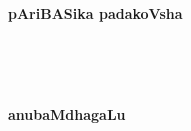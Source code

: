 \documentclass[twoside,11pt,openany]{book}
\begin{document}

\vfill\eject
\phantom{a}~
\thispagestyle{empty}
\newpage

\mainmatter

\setlength{\columnseprule}{.5pt}

\newpage
~\phantom{a}
\thispagestyle{empty}
\vfill
\begin{center}
{\Huge\bf pAriBASika padakoVsha}
\end{center}
\vfill\eject
\phantom{a}~
\thispagestyle{empty}
\newpage

\newpage
~\phantom{a}
\thispagestyle{empty}
\vfill
\begin{center}
{\fontsize{30pt}{32pt}\selectfont\bf anubaMdhagaLu}
\bigskip
\bigskip

{\bf{}}
\end{center}
\vfill\eject

\end{document}

